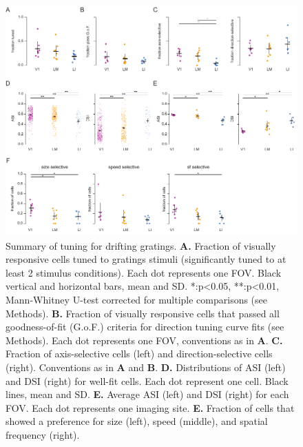 \begin{figure}[t!]
\includegraphics[width=\textwidth]{figures/supplemental/fig_s11_gratings_aggregate/fig_s11_gratings_aggregate.pdf}
    \centering
    \caption[Aggregated gratings metrics]{Summary of tuning for drifting gratings.
    \textbf{A.} Fraction of visually responsive cells tuned to gratings stimuli (significantly tuned to at least 2 stimulus conditions). Each dot represents one FOV. Black vertical and horizontal bars, mean and SD. *:p<0.05, **:p<0.01, Mann-Whitney U-test corrected for multiple comparisons (see Methods).
    \textbf{B.} Fraction of visually responsive cells that passed all goodness-of-fit (G.o.F.) criteria for direction tuning curve fits (see Methods). Each dot represents one FOV, conventions as in \textbf{A}.
    \textbf{C.} Fraction of axis-selective cells (left) and direction-selective cells (right). Conventions as in \textbf{A} and \textbf{B}.
    \textbf{D.} Distributions of ASI (left) and DSI (right) for well-fit cells. Each dot represent one cell. Black lines, mean and SD.
    \textbf{E.} Average ASI (left) and DSI (right) for each FOV. Each dot represents one imaging site.
    \textbf{E.} Fraction of cells that showed a preference for size (left), speed (middle), and spatial frequency (right). 
    \label{supfig:gratings_aggregate}}
\end{figure}

